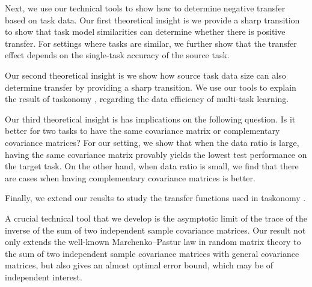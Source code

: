 
	Next, we use our technical tools to show how to determine negative transfer based on task data.
Our first theoretical insight is we provide a sharp transition to show that task model similarities can determine whether there is positive transfer.
		For settings where tasks are similar, we further show that the transfer effect depends on the single-task accuracy of the source task.

Our second theoretical insight is we show how source task data size can also determine transfer by providing a sharp transition.
		We use our tools to explain the result of taskonomy \cite{ZSSGM18}, regarding the data efficiency of multi-task learning.

Our third theoretical insight is has implications on the following question.
	Is it better for two tasks to have the same covariance matrix or complementary covariance matrices?
	For our setting, we show that when the data ratio is large, having the same covariance matrix provably yields the lowest test performance on the target task.
	On the other hand, when data ratio is small, we find that there are cases when having complementary covariance matrices is better.


Finally, we extend our reuslts to study the transfer functions used in taskonomy \cite{ZSSGM18}.

A crucial technical tool that we develop is the asymptotic limit of the trace of the inverse of the sum of two independent sample covariance matrices. Our result not only extends the well-known Marchenko–Pastur law in random matrix theory to the sum of two independent sample covariance matrices with general covariance matrices, but also gives an almost optimal error bound, which may be of independent interest.


